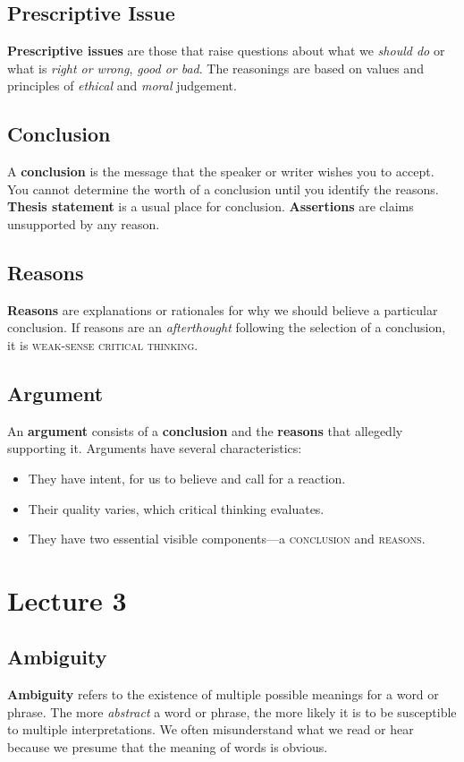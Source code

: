 \documentclass{article}
\begin{document}
\subsection{Prescriptive Issue}
\textbf{Prescriptive issues} are those that raise questions about what we \emph{should do} or what is \emph{right or wrong}, \emph{good or bad}. The reasonings are based on values and principles of \emph{ethical} and \emph{moral} judgement.

\subsection{Conclusion}
A \textbf{conclusion} is the message that the speaker or writer wishes you to accept. You cannot determine the worth of a conclusion until you identify the reasons. \textbf{Thesis statement} is a usual place for conclusion. \textbf{Assertions} are claims unsupported by any reason.

\subsection{Reasons}
\textbf{Reasons} are explanations or rationales for why we should believe a particular conclusion. If  reasons are an \emph{afterthought} following the selection of a conclusion, it is \textsc{weak-sense critical thinking}.

\subsection{Argument}
An \textbf{argument} consists of a \textbf{conclusion} and the \textbf{reasons} that allegedly supporting it. Arguments have several characteristics:
\begin{itemize}
  \item They have intent, for us to believe and call for a reaction.
  \item Their quality varies, which critical thinking evaluates.
  \item They have two essential visible components---a \textsc{conclusion} and \textsc{reasons}.
\end{itemize}

\section{Lecture 3}

\subsection{Ambiguity}
\textbf{Ambiguity} refers to the existence of multiple possible meanings for a word or phrase. The more \emph{abstract} a word or phrase, the more likely it is to be susceptible to multiple interpretations. 
We often misunderstand what we read or hear because we presume that the meaning of words is obvious.
\end{document}
